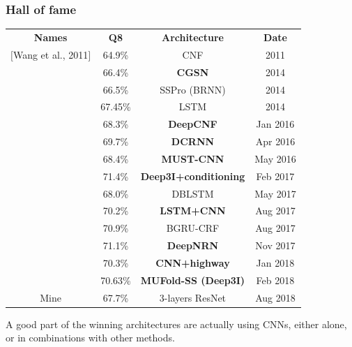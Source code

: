 	\subsubsection{Hall of fame}\label{sect:HoF}
	\begin{table}[h]
		\begin{tabular}{cccc}
			\textbf{Names} & \textbf{Q8} & \textbf{Architecture} & \textbf{Date} \\
			$[$Wang et al., 2011$]$	& 64.9\% 	& CNF 			& 2011 \\ 
			\cite{Zhou2014}	& 66.4\% 	& \textbf{CGSN} 			& 2014 \\ 
			\cite{Magnan2014} & 66.5\% & SSPro (BRNN) & 2014 \\
			\cite{Sønderby2014}	& 67.45\% 	& LSTM 			& 2014 	\\ 
			\cite{Wang2016} & 68.3\% & \textbf{DeepCNF} 	& Jan 2016 \\ 
			\cite{Li2016}	& 69.7\% 	& \textbf{DCRNN} 		& Apr 2016 \\
			\cite{Lin2016} 	& 68.4\% 	& \textbf{MUST-CNN} 		& May 2016 \\
			\cite{Busia2017}& 71.4\%& \textbf{Deep3I+conditioning}& Feb 2017 \\
			\cite{Hattori2017} & 68.0\%	& DBLSTM		& May 2017 \\
			\cite{Jurtz2017} & 70.2\%	& \textbf{LSTM+CNN} 		& Aug 2017 \\
			\cite{Johansen2017} & 70.9\% & BGRU-CRF & Aug 2017 \\
			\cite{8371925} & 71.1\% & \textbf{DeepNRN} & Nov 2017 \\
			\cite{Zhou2018} & 70.3\% & \textbf{CNN+highway} & Jan 2018 \\
			\cite{Fang2017}& 70.63\% & \textbf{MUFold-SS (Deep3I)}&Feb 2018\\
			
			Mine & 67.7\% & 3-layers ResNet & Aug 2018 \\ 
		\end{tabular}
	\end{table}
	
	A good part of the winning architectures are actually using CNNs, either alone, or in combinations with other methods.